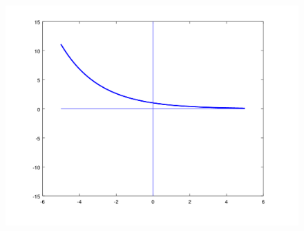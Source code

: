 \documentclass[11pt]{article}
\begin{document}
\begin{enumerate}
\begin{enumerate}
\begin{figure}[H]
				\centering
				\includegraphics[width=0.7\linewidth]{imgs/ex2c.png}
			\end{figure}
	\end{enumerate}
\end{enumerate}
\end{document}
